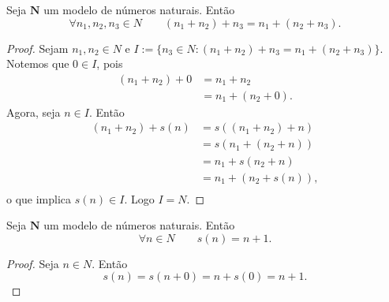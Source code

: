 \begin{teo} \label{conj.nat.ass}
	Seja $\bm N$ um modelo de números naturais. Então
	\begin{equation*}
	\forall n_1,n_2,n_3 \in N \qquad (n_1+n_2)+n_3 = n_1+(n_2+n_3).
	\end{equation*}
\end{teo}
\begin{proof}
	Sejam $n_1,n_2 \in N$ e $I := \{n_3 \in N: (n_1+n_2)+n_3 = n_1+(n_2+n_3)\}$. Notemos que $0 \in I$, pois
	\begin{align*}
	(n_1+n_2)+0 &= n_1+n_2						\tag{A1} \\
	&= n_1+(n_2+0).										\tag{A1}
	\end{align*}
	Agora, seja $n \in I$. Então
	\begin{align*}
	(n_1+n_2)+s(n) &= s((n_1+n_2)+n)			\tag{A2} \\
	&= s(n_1+(n_2+n)) 									\tag{$n \in I$}\\
	&= n_1+s(n_2+n)										\tag{A2} \\
	&= n_1+(n_2+s(n)),									\tag{A2} \\
	\end{align*}
o que implica $s(n) \in I$. Logo $I=N$.
\end{proof}

\begin{teo} \label{conj.nat.suc}
	Seja $\bm N$ um modelo de números naturais. Então
	\begin{equation*}
	\forall n \in N \qquad s(n) = n+1.
	\end{equation*}
\end{teo}
\begin{proof}
	Seja $n \in N$. Então
	\begin{equation*}
	s(n) = s(n+0)=n+s(0)=n+1.
	\end{equation*}
\end{proof}

